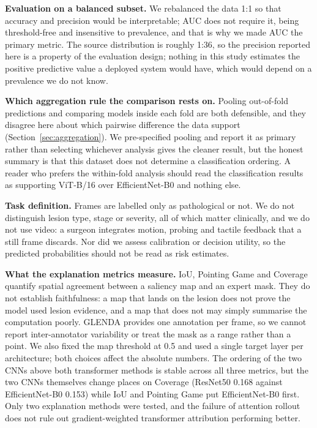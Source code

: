\documentclass[preprint,12pt]{elsarticle}
\begin{document}
\textbf{Evaluation on a balanced subset.} We rebalanced the data 1:1 so that accuracy and precision would be interpretable; AUC does not require it, being threshold-free and insensitive to prevalence, and that is why we made AUC the primary metric. The source distribution is roughly 1:36, so the precision reported here is a property of the evaluation design; nothing in this study estimates the positive predictive value a deployed system would have, which would depend on a prevalence we do not know.

\textbf{Which aggregation rule the comparison rests on.} Pooling out-of-fold predictions and comparing models inside each fold are both defensible, and they disagree here about which pairwise difference the data support (Section~\ref{sec:aggregation}). We pre-specified pooling and report it as primary rather than selecting whichever analysis gives the cleaner result, but the honest summary is that this dataset does not determine a classification ordering. A reader who prefers the within-fold analysis should read the classification results as supporting ViT-B/16 over EfficientNet-B0 and nothing else.

\textbf{Task definition.} Frames are labelled only as pathological or not. We do not distinguish lesion type, stage or severity, all of which matter clinically, and we do not use video: a surgeon integrates motion, probing and tactile feedback that a still frame discards. Nor did we assess calibration or decision utility, so the predicted probabilities should not be read as risk estimates.

\textbf{What the explanation metrics measure.} IoU, Pointing Game and Coverage quantify spatial agreement between a saliency map and an expert mask. They do not establish faithfulness: a map that lands on the lesion does not prove the model used lesion evidence, and a map that does not may simply summarise the computation poorly. GLENDA provides one annotation per frame, so we cannot report inter-annotator variability or treat the mask as a range rather than a point. We also fixed the map threshold at 0.5 and used a single target layer per architecture; both choices affect the absolute numbers. The ordering of the two CNNs above both transformer methods is stable across all three metrics, but the two CNNs themselves change places on Coverage (ResNet50 0.168 against EfficientNet-B0 0.153) while IoU and Pointing Game put EfficientNet-B0 first. Only two explanation methods were tested, and the failure of attention rollout does not rule out gradient-weighted transformer attribution performing better.
\end{document}
